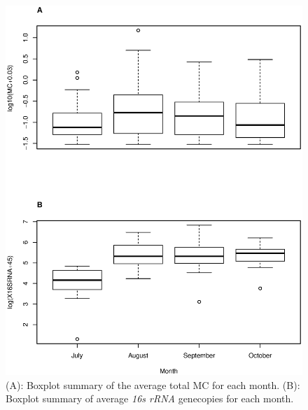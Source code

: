 
\begin{figure}[!h]
\includegraphics[width=\textwidth]{figures/time4}
\caption{
(A): Boxplot summary of the average total MC for each month. 
(B): Boxplot summary of average \emph{16s rRNA} genecopies for each month.
}
\label{fig:time3}
\end{figure}

